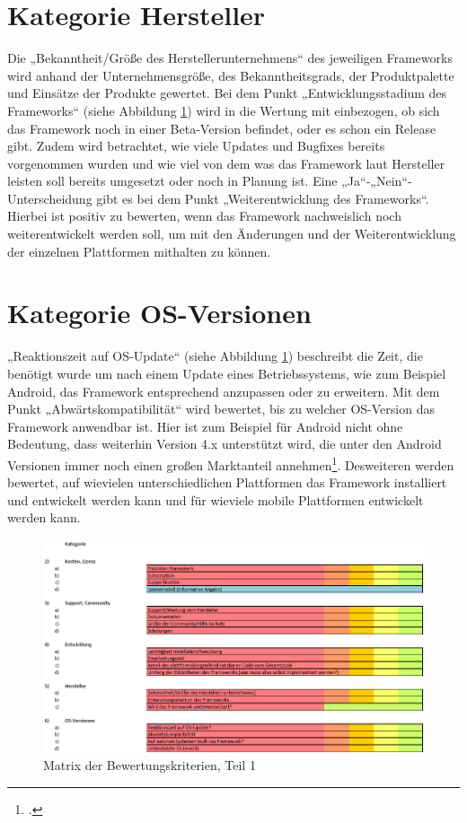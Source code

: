 \section{Kategorie Hersteller}

Die „Bekanntheit/Größe des Herstellerunternehmens“ des jeweiligen Frameworks wird anhand der Unternehmensgröße, des Bekanntheitsgrads, der Produktpalette und Einsätze der Produkte gewertet. Bei dem Punkt „Entwicklungsstadium des Frameworks“ (siehe Abbildung \ref{fig:Bewertungskriterien_1}) wird in die Wertung mit einbezogen, ob sich das Framework noch in einer Beta-Version befindet, oder es schon ein Release gibt. Zudem wird betrachtet, wie viele Updates und Bugfixes bereits vorgenommen wurden und wie viel von dem was das Framework laut Hersteller leisten soll bereits umgesetzt oder noch in Planung ist. Eine „Ja“-„Nein“-Unterscheidung gibt es bei dem Punkt „Weiterentwicklung des Frameworks“. Hierbei ist positiv zu bewerten, wenn das Framework nachweislich noch weiterentwickelt werden soll, um mit den Änderungen und der Weiterentwicklung der einzelnen Plattformen mithalten zu können.

\section{Kategorie OS-Versionen}

„Reaktionszeit auf OS-Update“ (siehe Abbildung \ref{fig:Bewertungskriterien_1}) beschreibt die Zeit, die benötigt wurde um nach einem Update eines Betriebssystems, wie zum Beispiel Android, das Framework entsprechend anzupassen oder zu erweitern. Mit dem Punkt „Abwärtskompatibilität“ wird bewertet, bis zu welcher OS-Version das Framework anwendbar ist. Hier ist zum Beispiel für Android nicht ohne Bedeutung, dass weiterhin Version 4.x unterstützt wird, die unter den Android Versionen immer noch einen großen Marktanteil annehmen\footcite{AndroidMarktanteil4}. Desweiteren werden bewertet, auf wievielen unterschiedlichen Plattformen das Framework installiert und entwickelt werden kann und für wieviele mobile Plattformen entwickelt werden kann. 

\begin{figure}[h]
	\centering
	\includegraphics[width=1\textwidth]{Bilder/Bewertungsmatrix_1.PNG}
	\caption{Matrix der Bewertungskriterien, Teil 1}
	\label{fig:Bewertungskriterien_1}
\end{figure}

